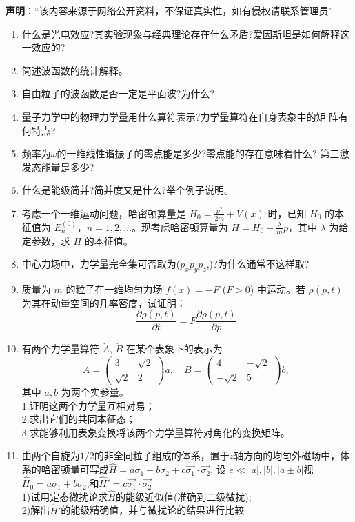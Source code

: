 
\textbf{声明}：“该内容来源于网络公开资料，不保证真实性，如有侵权请联系管理员”


\begin{enumerate}
\item 什么是光电效应?其实验现象与经典理论存在什么矛盾?爱因斯坦是如何解释这一效应的?
\item 简述波函数的统计解释。
\item 自由粒子的波函数是否一定是平面波?为什么?
\item 量子力学中的物理力学量用什么算符表示?力学量算符在自身表象中的矩
阵有何特点?
\item 频率为$\omega$的一维线性谐振子的零点能是多少?零点能的存在意味着什么?
第三激发态能量是多少?
\item 什么是能级简并?简并度又是什么?举个例子说明。
\item 考虑一个一维运动问题，哈密顿算量是 $H_0 = \frac{p^2}{2m} + V(x)$ 时，已知 $H_0$ 的本征值为 $E_n^{(0)}$，$n = 1, 2, \dots$。现考虑哈密顿算量为 $H = H_0 + \frac{\lambda}{m} p$，其中 $\lambda$ 为给定参数，求 $H$ 的本征值。
\item 中心力场中，力学量完全集可否取为($p_xp_yp_z$,)?为什么通常不这样取?
\item 质量为 $m$ 的粒子在一维均匀力场 $f(x) = -F$ ($F > 0$) 中运动。若 $\rho(p, t)$ 为其在动量空间的几率密度，试证明：
$$\frac{\partial \rho(p, t)}{\partial t} = F \frac{\partial \rho(p, t)}{\partial p}~$$
\item 有两个力学量算符 $\dot A$, $\dot B$ 在某个表象下的表示为
$$A = \begin{pmatrix}3 & \sqrt{2} \\\sqrt{2} & 2\end{pmatrix} a, \quad B = \begin{pmatrix}4 & -\sqrt{2} \\-\sqrt{2} & 5\end{pmatrix} b,~$$
其中 $a, b$ 为两个实参量。\\
1.证明这两个力学量互相对易；\\
2.求出它们的共同本征态；\\
3.求能够利用表象变换将该两个力学量算符对角化的变换矩阵。\\
\item 由两个自旋为$1/2$的非全同粒子组成的体系，置于$z$轴方向的均匀外磁场中，体系的哈密顿量可写成$\hat{H} = a\sigma_1 + b\sigma_2 + c\vec{\sigma_1} \cdot \vec{\sigma_2}$, 设 $e \ll |a|, |b|, |a \pm b|$视$\hat{H}_0 = a\sigma_1 + b\sigma_2$,和$\hat{H}' = c\vec{\sigma_1} \cdot \vec{\sigma_2}$\\
1)试用定态微扰论求$\hat{H}$的能级近似值(准确到二级微扰);\\
2)解出$\hat{H}'$的能级精确值，并与微扰论的结果进行比较\\
\end{enumerate}
